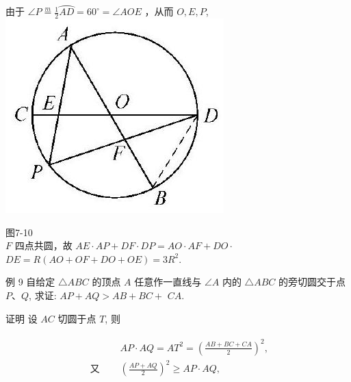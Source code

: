 \documentclass[10pt]{article}
\begin{document}
由于 $\angle P \stackrel{m}{=} \frac{1}{2} \overparen{A D}=60^{\circ}=\angle A O E$ ，从而 $O, E, P$,\\
\includegraphics[max width=\textwidth, center]{2024_10_30_66b8e5e701da2093c133g-055}

图7-10\\
$F$ 四点共圆，故 $A E \cdot A P+D F \cdot D P=A O \cdot A F+D O \cdot$ $D E=R(A O+O F+D O+O E)=3 R^{2}$.

例 9 自给定 $\triangle A B C$ 的顶点 $A$ 任意作一直线与 $\angle A$ 内的 $\triangle A B C$ 的旁切圆交于点 $P 、 Q$, 求证: $A P+A Q>A B+B C+$ $C A$.

证明 设 $A C$ 切圆于点 $T$, 则

\begin{align*}
\begin{array}{cc} 
& A P \cdot A Q=A T^{2}=\left(\frac{A B+B C+C A}{2}\right)^{2}, \\
\text { 又 } \quad & \left(\frac{A P+A Q}{2}\right)^{2} \geqslant A P \cdot A Q,
\end{array}
\end{align*}
\end{document}
